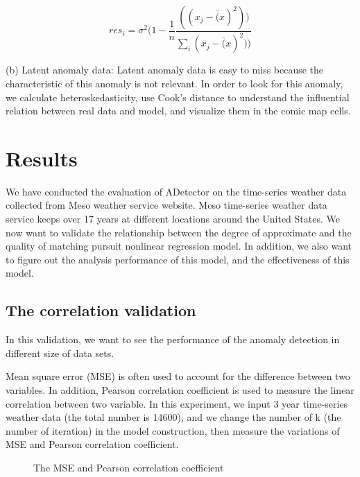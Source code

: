 \documentclass{vgtc}                          %
\begin{document}
\begin{equation}
res_i = \sigma^2 ( 1 -\frac{1}{n} \frac{((x_j - \overline(x)^2))}{\sum_i(x_j - \overline(x)^2))}
\end{equation}		 

(b) Latent anomaly data: Latent anomaly data is easy to miss because the characteristic of this anomaly is not relevant. In order to look for this anomaly, we calculate heteroskedasticity, use Cook's distance to understand the influential relation between real data and model, and visualize them in the comic map cells. 

\section{Results}

We have conducted the evaluation of ADetector on the time-series weather data collected from Meso weather service website. Meso time-series weather data service keeps over 17 years at different locations around the United States. We now want to validate the relationship between the degree of approximate and the quality of matching pursuit nonlinear regression model. In addition, we also want to figure out the analysis performance of this model, and the effectiveness of this model.

\subsection{The correlation validation}

In this validation, we want to see the performance of the anomaly detection in different size of data sets. 

Mean square error (MSE) is often used to account for the difference between two variables. In addition, Pearson correlation coefficient is used to measure the linear correlation between two variable. In this experiment, we input 3 year time-series weather data (the total number is 14600), and we change the number of k (the number of iteration) in the model construction, then measure the variations of MSE and Pearson correlation coefficient. 
\begin{figure}[htb]
	\caption{The MSE and Pearson correlation coefficient}
	\label{fig:MSEandPearsonCorr}
\end{figure}
\end{document}
